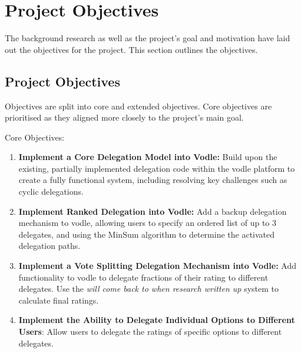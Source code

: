 \chapter{Project Objectives}
\label{ch:project_objectives}
The background research as well as the project's goal and motivation have laid out the objectives for the project. This section outlines the objectives.
\section{Project Objectives}
\label{section:project_objectives}
Objectives are split into core and extended objectives. Core objectives are prioritised as they aligned more closely to the project's main goal.

Core Objectives:
\begin{enumerate}
    \item \textbf{Implement a Core Delegation Model into Vodle: } Build upon the existing, partially implemented delegation code within the vodle platform to create a fully functional system, including resolving key challenges such as cyclic delegations.

    \item \textbf{Implement Ranked Delegation into Vodle: } Add a backup delegation mechanism to vodle, allowing users to specify an ordered list of up to 3 delegates, and using the MinSum algorithm to determine the activated delegation paths.

    \item \textbf{Implement a Vote Splitting Delegation Mechanism into Vodle: } Add functionality to vodle to delegate fractions of their rating to different delegates. Use the \textit{will come back to when research written up} system to calculate final ratings.

    \item \textbf{Implement the Ability to Delegate Individual Options to Different Users}: Allow users to delegate the ratings of specific options to different delegates.
\end{enumerate}


